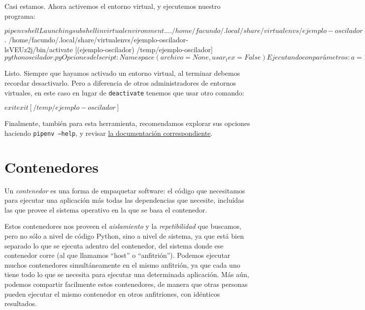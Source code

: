 Casi estamos. Ahora activemos el entorno virtual, y ejecutemos nuestro programa:

\begin{shell}
$ pipenv shell
Launching subshell in virtual environment...
 . /home/facundo/.local/share/virtualenvs/ejemplo-oscilador-lsVEUz2j/bin/activate
/temp/ejemplo-oscilador$  . /home/facundo/.local/share/virtualenvs/ejemplo-oscilador-lsVEUz2j/bin/activate
[(ejemplo-oscilador) /temp/ejemplo-oscilador]$ python oscilador.py 
Opciones del script: Namespace(archivo=None, usar_tex=False)
Ejecutando con parámetros: a=17 b=1 λ=15.4 µ=0.75
Config de matplotlib: {'font.size': 14, 'axes.labelsize': 'large'}
[(ejemplo-oscilador) /temp/ejemplo-oscilador]$ 
\end{shell}

Listo. Siempre que hayamos activado un entorno virtual, al terminar debemos recordar desactivarlo. Pero a diferencia de otros administradores de entornos virtuales, en este caso en lugar de \texttt{deactivate} tenemos que usar otro comando:

\begin{shell}
$ exit
exit
[/temp/ejemplo-oscilador]$ 
\end{shell}

Finalmente, también para esta herramienta, recomendamos explorar sus opciones haciendo \texttt{pipenv --help}, y revisar \href{https://pipenv-es.readthedocs.io/es/latest/}{la documentación correspondiente}.


\section{Contenedores} \label{sec:contenedores}

Un \textit{contenedor} es una forma de empaquetar software: el código que necesitamos para ejecutar una aplicación más todas las dependencias que necesite, incluídas las que provee el sistema operativo en la que se basa el contenedor.

Estos contenedores nos proveen el \textit{aislamiento} y la \textit{repetibilidad} que buscamos, pero no sólo a nivel de código Python, sino a nivel de sistema, ya que está bien separado lo que se ejecuta adentro del contenedor, del sistema donde ese contenedor corre (al que llamamos ``host'' o ``anfitrión''). Podemos ejecutar muchos contenedores simultáneamente en el mismo anfitrión, ya que cada uno tiene todo lo que se necesita para ejecutar una determinada aplicación. Más aún, podemos compartir facilmente estos contenedores, de manera que otras personas pueden ejecutar el mismo contenedor en otros anfitriones, con idénticos resultados.


